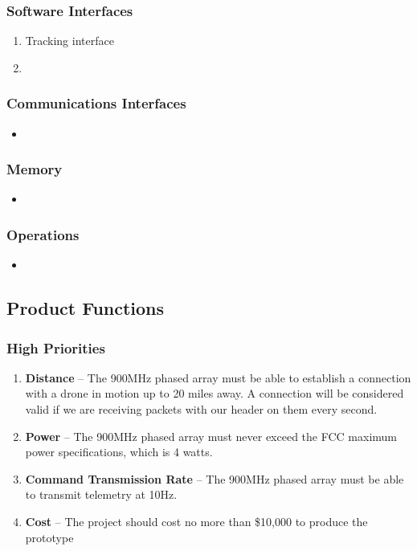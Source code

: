 \documentclass[ProjectRequirements.tex]{subfiles}
\begin{document}
		\subsubsection{Software Interfaces}
			\begin{enumerate}\itemsep1pt
				\item Tracking interface
				\item 
			\end{enumerate}
			
		\subsubsection{Communications Interfaces}
			\begin{itemize}\itemsep1pt
				\item 
			\end{itemize}
			
		\subsubsection{Memory}
			\begin{itemize}\itemsep1pt
				\item 
			\end{itemize}
		
		\subsubsection{Operations}
			\begin{itemize}\itemsep1pt
				\item 
			\end{itemize}
		
	\subsection{Product Functions}
	
		\subsubsection{High Priorities}
			\begin{enumerate}
				\item \textbf{Distance} -- The 900MHz phased array must be able to establish a connection with a drone in motion up to 20 miles away. A connection will be considered valid if we are receiving packets with our header on them every second.
				\item \textbf{Power} -- The 900MHz phased array must never exceed the FCC maximum power specifications, which is 4 watts.
				\item \textbf{Command Transmission Rate} -- The 900MHz phased array must be able to transmit telemetry at 10Hz.
				\item \textbf{Cost} -- The project should cost no more than \$10,000 to produce the prototype
							
			\end{enumerate}
		
\end{document}
